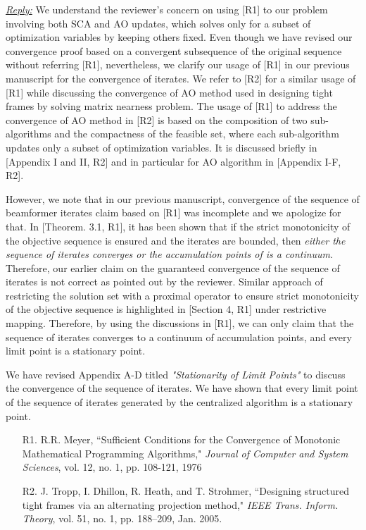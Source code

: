\begin{itemize}
	\vspace{1eM}
	\underline{\textit{Reply:}} We understand the reviewer's concern on using [R1] to our problem involving both \ac{SCA} and \ac{AO} updates, which solves only for a subset of optimization variables by keeping others fixed. Even though we have revised our convergence proof based on a convergent subsequence of the original sequence without referring [R1], nevertheless, we clarify our usage of [R1] in our previous manuscript for the convergence of iterates. We refer to [R2] for a similar usage of [R1] while discussing the convergence of \ac{AO} method used in designing tight frames by solving matrix nearness problem. The usage of [R1] to address the convergence of \ac{AO} method in [R2] is based on the composition of two sub-algorithms and the compactness of the feasible set, where each sub-algorithm updates only a subset of optimization variables. It is discussed briefly in [Appendix I and II, R2] and in particular for \ac{AO} algorithm in [Appendix I-F, R2].
	
	However, we note that in our previous manuscript, convergence of the sequence of beamformer iterates claim based on [R1] was incomplete and we apologize for that. In [Theorem. 3.1, R1], it has been shown that if the strict monotonicity of the objective sequence is ensured and the iterates are bounded, then \textit{either the sequence of iterates converges or the accumulation points of  is a continuum}. Therefore, our earlier claim on the guaranteed convergence of the sequence of iterates is not correct as pointed out by the reviewer. Similar approach of restricting the solution set with a proximal operator to ensure strict monotonicity of the objective sequence is highlighted in [Section 4, R1] under restrictive mapping. Therefore, by using the discussions in [R1], we can only claim that the sequence of iterates  converges to a continuum of accumulation points, and every limit point is a stationary point.
	
	We have revised Appendix A-D titled \textit{"Stationarity of Limit Points"} to discuss the convergence of the sequence of iterates. We have shown that every limit point of the sequence of iterates generated by the centralized algorithm is a stationary point.
	
	\vspace{1eM}
	\begin{itemize}		
		\item[R1.] R.R. Meyer, ``Sufficient Conditions for the Convergence of Monotonic Mathematical Programming Algorithms," \emph{Journal of Computer and System Sciences}, vol. 12, no. 1, pp. 108-121, 1976
		\item[R2.] J. Tropp, I. Dhillon, R. Heath, and T. Strohmer, ``Designing structured tight frames via an alternating projection method," \emph{IEEE Trans. Inform. Theory}, vol. 51, no. 1, pp. 188–209, Jan. 2005.
	\end{itemize}
	
\end{itemize}